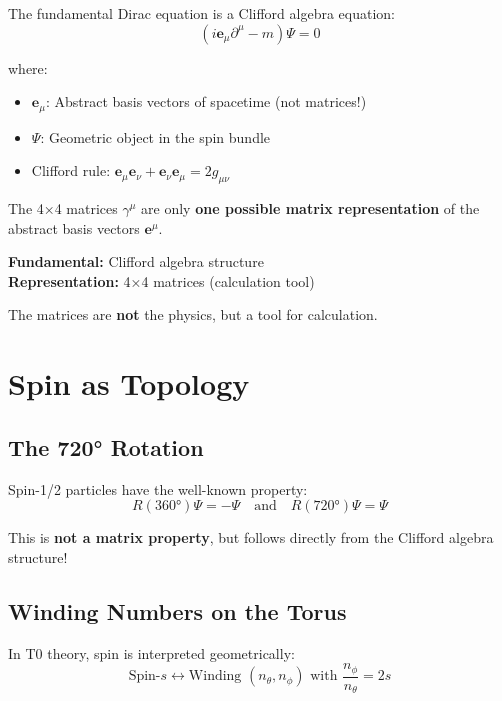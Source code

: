 	The fundamental Dirac equation is a Clifford algebra equation:
	\begin{equation}
		\boxed{(i \mathbf{e}_\mu \partial^\mu - m)\Psi = 0}
	\end{equation}
	
	where:
	\begin{itemize}
		\item $\mathbf{e}_\mu$: Abstract basis vectors of spacetime (not matrices!)
		\item $\Psi$: Geometric object in the spin bundle
		\item Clifford rule: $\mathbf{e}_\mu \mathbf{e}_\nu + \mathbf{e}_\nu \mathbf{e}_\mu = 2g_{\mu\nu}$
	\end{itemize}
	
	The 4×4 matrices $\gamma^\mu$ are only \textbf{one possible matrix representation} 
	of the abstract basis vectors $\mathbf{e}^\mu$.
	
	\begin{keypoint}
		\textbf{Fundamental:} Clifford algebra structure \\
		\textbf{Representation:} 4×4 matrices (calculation tool)
		
		The matrices are \textbf{not} the physics, but a tool for calculation.
	\end{keypoint}
	
	\section{Spin as Topology}
	
	\subsection{The 720° Rotation}
	
	Spin-1/2 particles have the well-known property:
	\begin{equation}
		R(360°)\Psi = -\Psi \quad \text{and} \quad R(720°)\Psi = \Psi
	\end{equation}
	
	This is \textbf{not a matrix property}, but follows directly from the 
	Clifford algebra structure!
	
	\subsection{Winding Numbers on the Torus}
	
	In T0 theory, spin is interpreted geometrically:
	\begin{equation}
		\text{Spin-}s \longleftrightarrow \text{Winding } (n_\theta, n_\phi) 
		\text{ with } \frac{n_\phi}{n_\theta} = 2s
	\end{equation}
	
